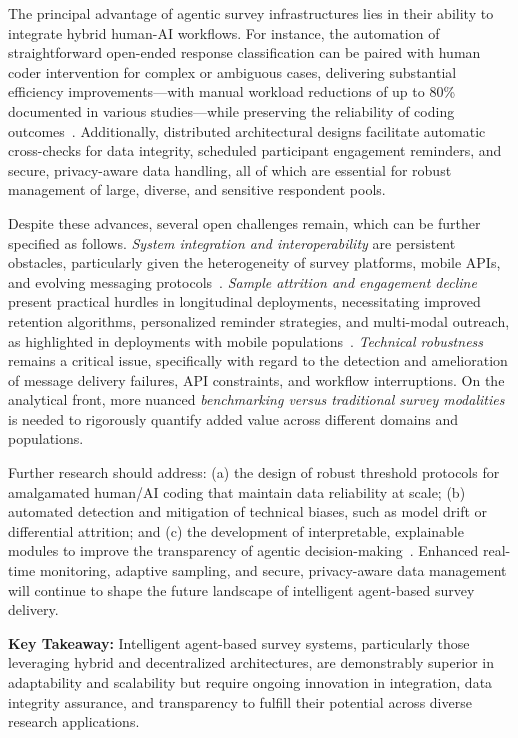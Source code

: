 \documentclass[sigconf]{acmart}
\begin{document}
The principal advantage of agentic survey infrastructures lies in their ability to integrate hybrid human-AI workflows. For instance, the automation of straightforward open-ended response classification can be paired with human coder intervention for complex or ambiguous cases, delivering substantial efficiency improvements—with manual workload reductions of up to 80\% documented in various studies—while preserving the reliability of coding outcomes~\cite{ref112}\cite{ref113}. Additionally, distributed architectural designs facilitate automatic cross-checks for data integrity, scheduled participant engagement reminders, and secure, privacy-aware data handling, all of which are essential for robust management of large, diverse, and sensitive respondent pools.

Despite these advances, several open challenges remain, which can be further specified as follows. \textit{System integration and interoperability} are persistent obstacles, particularly given the heterogeneity of survey platforms, mobile APIs, and evolving messaging protocols~\cite{ref117}. \textit{Sample attrition and engagement decline} present practical hurdles in longitudinal deployments, necessitating improved retention algorithms, personalized reminder strategies, and multi-modal outreach, as highlighted in deployments with mobile populations~\cite{ref117}. \textit{Technical robustness} remains a critical issue, specifically with regard to the detection and amelioration of message delivery failures, API constraints, and workflow interruptions. On the analytical front, more nuanced \textit{benchmarking versus traditional survey modalities} is needed to rigorously quantify added value across different domains and populations.

Further research should address: (a) the design of robust threshold protocols for amalgamated human/AI coding that maintain data reliability at scale; (b) automated detection and mitigation of technical biases, such as model drift or differential attrition; and (c) the development of interpretable, explainable modules to improve the transparency of agentic decision-making~\cite{ref104}\cite{ref113}. Enhanced real-time monitoring, adaptive sampling, and secure, privacy-aware data management will continue to shape the future landscape of intelligent agent-based survey delivery.

\textbf{Key Takeaway:} Intelligent agent-based survey systems, particularly those leveraging hybrid and decentralized architectures, are demonstrably superior in adaptability and scalability but require ongoing innovation in integration, data integrity assurance, and transparency to fulfill their potential across diverse research applications.
\end{document}
